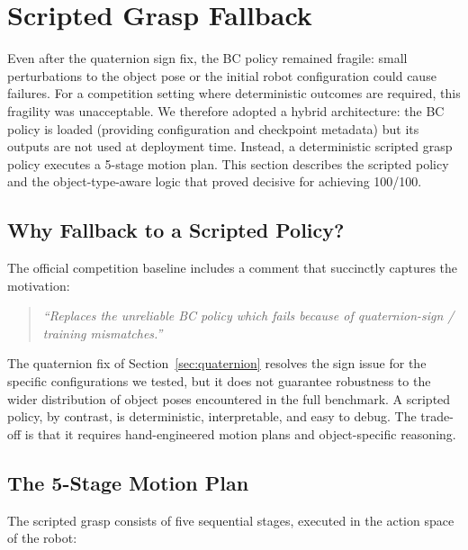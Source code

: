 \section{Scripted Grasp Fallback}
\label{sec:scripted_grasp}

Even after the quaternion sign fix, the BC policy remained fragile: small perturbations to the object pose or the initial robot configuration could cause failures. For a competition setting where deterministic outcomes are required, this fragility was unacceptable. We therefore adopted a hybrid architecture: the BC policy is loaded (providing configuration and checkpoint metadata) but its outputs are not used at deployment time. Instead, a deterministic scripted grasp policy executes a 5-stage motion plan. This section describes the scripted policy and the object-type-aware logic that proved decisive for achieving 100/100.

\subsection{Why Fallback to a Scripted Policy?}
\label{sec:scripted_grasp:why}

The official competition baseline includes a comment that succinctly captures the motivation:
\begin{quote}
\emph{``Replaces the unreliable BC policy which fails because of quaternion-sign / training mismatches.''}
\end{quote}

The quaternion fix of Section~\ref{sec:quaternion} resolves the sign issue for the specific configurations we tested, but it does not guarantee robustness to the wider distribution of object poses encountered in the full benchmark. A scripted policy, by contrast, is deterministic, interpretable, and easy to debug. The trade-off is that it requires hand-engineered motion plans and object-specific reasoning.

\subsection{The 5-Stage Motion Plan}
\label{sec:scripted_grasp:five_stage}

The scripted grasp consists of five sequential stages, executed in the action space of the robot:

